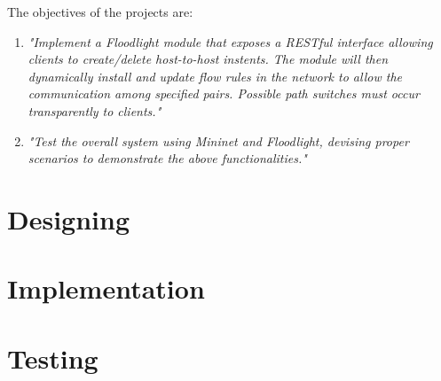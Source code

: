 \documentclass[a4paper]{report}
\begin{document}
	
	\noindent The objectives of the projects are:
	\begin{enumerate}
		\item \textit{"Implement a Floodlight module that exposes a RESTful interface allowing clients to create/delete host-to-host instents. The module will then dynamically install and update flow rules in the network to allow the communication among specified pairs. Possible path switches must occur transparently to clients."}
		
		\item \textit{"Test the overall system using Mininet and Floodlight, devising proper scenarios to demonstrate the above functionalities."}
	\end{enumerate}
	
	\chapter{Designing}
	
	\chapter{Implementation}
	
	\chapter{Testing}
\end{document}
